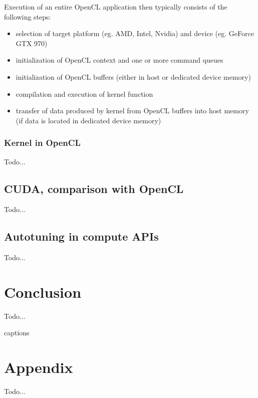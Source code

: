\documentclass
[
    digital, %
    oneside, %
    table, %
    nolof, %
    nolot, %
    nocover %
]{fithesis3}
\begin{document}
Execution of an entire OpenCL application then typically consists of the following steps:
\begin{itemize}
    \item selection of target platform (eg. AMD, Intel, Nvidia) and device (eg. GeForce GTX 970)
    \item initialization of OpenCL context and one or more command queues
    \item initialization of OpenCL buffers (either in host or dedicated device memory)
    \item compilation and execution of kernel function
    \item transfer of data produced by kernel from OpenCL buffers into host memory (if data is located in dedicated device memory)
\end{itemize}




\subsection{Kernel in OpenCL}
Todo...

\section{CUDA, comparison with OpenCL}
Todo...

\section{Autotuning in compute APIs}
Todo...

\chapter{Conclusion}
Todo...

{\csname captions\languagename\endcsname
\makeatletter
\thesis@selectLocale{\thesis@locale}\makeatother
\printbibliography[heading=bibintoc]}

\appendix
\chapter{Appendix}
Todo...
\end{document}
